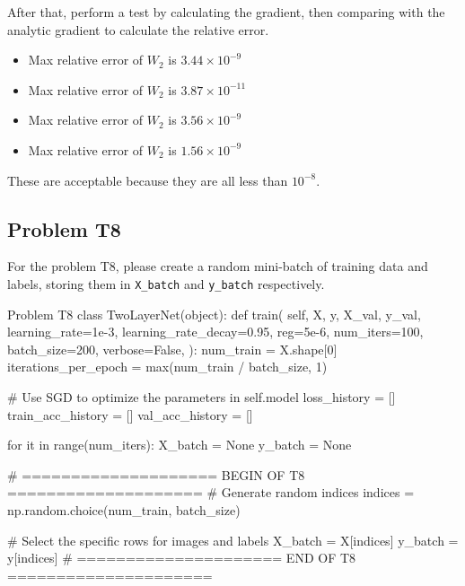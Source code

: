 \documentclass[12pt, a4paper]{article}
\begin{document}
            After that, perform a test by calculating the gradient, then comparing with the analytic gradient to calculate the relative error.
            \begin{itemize}
                \item Max relative error of $W_2$ is $3.44 \times {10}^{-9}$
                \item Max relative error of $W_2$ is $3.87 \times {10}^{-11}$
                \item Max relative error of $W_2$ is $3.56 \times {10}^{-9}$
                \item Max relative error of $W_2$ is $1.56 \times {10}^{-9}$
            \end{itemize}
            These are acceptable because they are all less than ${10}^{-8}$.

    \pagebreak

        \subsection{Problem T8}
            For the problem T8, please create a random mini-batch of training data and labels, storing them in \texttt{X\_batch} and \texttt{y\_batch} respectively.

            \begin{codeblock}{Problem T8}
                class TwoLayerNet(object):
                    def train(
                        self, X, y, X_val, y_val,
                        learning_rate=1e-3,
                        learning_rate_decay=0.95,
                        reg=5e-6,
                        num_iters=100,
                        batch_size=200,
                        verbose=False,
                    ):
                        num_train = X.shape[0]
                        iterations_per_epoch = max(num_train / batch_size, 1)

                        # Use SGD to optimize the parameters in self.model
                        loss_history = []
                        train_acc_history = []
                        val_acc_history = []

                        for it in range(num_iters):
                            X_batch = None
                            y_batch = None

                            # ==================== BEGIN OF T8 ====================
                            # Generate random indices
                            indices = np.random.choice(num_train, batch_size)

                            # Select the specific rows for images and labels
                            X_batch = X[indices]
                            y_batch = y[indices]
                            # ===================== END OF T8 =====================
            \end{codeblock}
\end{document}
